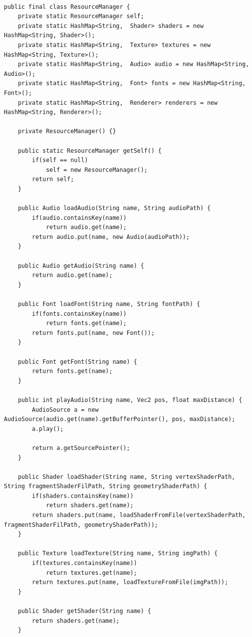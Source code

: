 \documentclass[12pt, 
openright, 
oneside, 
a4paper,    
brazil]{facom-ufu-abntex2}
\begin{document}
\begin{lstlisting}[caption=Classe Resource Manager]
 
public final class ResourceManager {
    private static ResourceManager self;
    private static HashMap<String,  Shader> shaders = new HashMap<String, Shader>();
    private static HashMap<String,  Texture> textures = new HashMap<String, Texture>();
    private static HashMap<String,  Audio> audio = new HashMap<String, Audio>();
    private static HashMap<String,  Font> fonts = new HashMap<String, Font>();
    private static HashMap<String,  Renderer> renderers = new HashMap<String, Renderer>();

    private ResourceManager() {}
     
    public static ResourceManager getSelf() {
        if(self == null) 
            self = new ResourceManager();
        return self;
    }
     
    public Audio loadAudio(String name, String audioPath) {
        if(audio.containsKey(name))
            return audio.get(name);
        return audio.put(name, new Audio(audioPath));
    }
     
    public Audio getAudio(String name) {
        return audio.get(name);
    }
     
    public Font loadFont(String name, String fontPath) {
        if(fonts.containsKey(name))
            return fonts.get(name);
        return fonts.put(name, new Font());
    }
     
    public Font getFont(String name) {
        return fonts.get(name);
    }
     
    public int playAudio(String name, Vec2 pos, float maxDistance) {
        AudioSource a = new AudioSource(audio.get(name).getBufferPointer(), pos, maxDistance);
        a.play();
         
        return a.getSourcePointer();
    }

    public Shader loadShader(String name, String vertexShaderPath, String fragmentShaderFilPath, String geometryShaderPath) {
        if(shaders.containsKey(name))
            return shaders.get(name);
        return shaders.put(name, loadShaderFromFile(vertexShaderPath, fragmentShaderFilPath, geometryShaderPath));
    }

    public Texture loadTexture(String name, String imgPath) {
        if(textures.containsKey(name))
            return textures.get(name);
        return textures.put(name, loadTextureFromFile(imgPath));
    }
     
    public Shader getShader(String name) {
        return shaders.get(name);
    }
     

\end{lstlisting}
\end{document}
